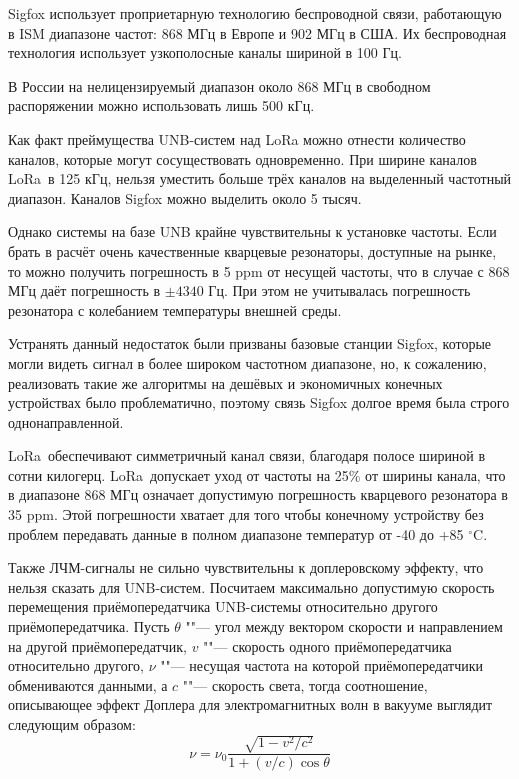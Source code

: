 Sigfox использует проприетарную технологию беспроводной связи, работающую в ISM 
диапазоне частот: 868 МГц в Европе и 902 МГц в США. 
Их беспроводная технология использует узкополосные каналы шириной в 100 Гц.

В России на нелицензируемый диапазон около 868 МГц в свободном распоряжении 
можно использовать лишь 500 кГц.

Как факт преймущества UNB-систем над LoRa можно отнести количество 
каналов, которые могут сосуществовать одновременно. При ширине каналов 
LoRa\texttrademark~в 125 кГц, нельзя уместить больше трёх каналов на 
выделенный частотный диапазон. 
Каналов Sigfox можно выделить около 5 тысяч.

Однако системы на базе UNB крайне чувствительны к установке частоты. 
Если брать в расчёт очень качественные кварцевые резонаторы, доступные на 
рынке, то можно получить погрешность в 5 ppm от несущей частоты, что в случае с 
868 МГц даёт погрешность в $\pm 4340$ Гц. При этом не учитывалась погрешность 
резонатора с колебанием температуры внешней среды. 

Устранять данный недостаток были призваны базовые станции Sigfox, которые могли 
видеть сигнал в более широком частотном диапазоне, но, к сожалению, реализовать 
такие же алгоритмы на дешёвых и экономичных конечных устройствах было 
проблематично, поэтому связь Sigfox долгое время была строго однонаправленной.

LoRa\texttrademark~обеспечивают симметричный канал связи, благодаря полосе шириной в 
сотни килогерц. 
LoRa\texttrademark~допускает уход от частоты на 25\% от ширины канала, что в 
диапазоне 868 МГц означает допустимую погрешность кварцевого резонатора в 35 
ppm. 
Этой погрешности хватает для того чтобы конечному устройству без проблем 
передавать данные в полном диапазоне температур от -40 до +85 $^\circ$C.

Также ЛЧМ-сигналы не сильно чувствительны к доплеровскому эффекту, что нельзя 
сказать для UNB-систем. 
Посчитаем максимально допустимую скорость перемещения приёмопередатчика UNB-системы
относительно другого приёмопередатчика.
Пусть $\theta$ ""--- угол между вектором скорости и направлением на другой 
приёмопередатчик, $v$ ""--- скорость одного приёмопередатчика относительно другого,
$\nu$ ""--- несущая частота на которой приёмопередатчики обмениваются данными, 
а $c$ ""--- скорость света, тогда соотношение, описывающее 
эффект Доплера для электромагнитных волн в вакууме выглядит следующим образом:
\begin{equation}
	\nu = \nu_{0} \frac{\sqrt{1-v^{2}/c^{2}}}{1+(v/c)\cos{\theta}}
\end{equation}

